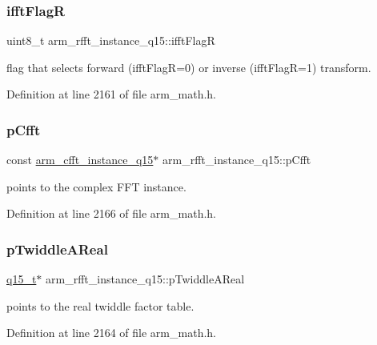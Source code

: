 \subsubsection{\texorpdfstring{ifft\+FlagR}{ifftFlagR}}
{\footnotesize\ttfamily uint8\+\_\+t arm\+\_\+rfft\+\_\+instance\+\_\+q15\+::ifft\+FlagR}

flag that selects forward (ifft\+FlagR=0) or inverse (ifft\+FlagR=1) transform. 

Definition at line 2161 of file arm\+\_\+math.\+h.

\mbox{\label{structarm__rfft__instance__q15_a4329c15b056444746d37ff082a24d31a}} 
\subsubsection{\texorpdfstring{p\+Cfft}{pCfft}}
{\footnotesize\ttfamily const \hyperlink{structarm__cfft__instance__q15}{arm\+\_\+cfft\+\_\+instance\+\_\+q15}$\ast$ arm\+\_\+rfft\+\_\+instance\+\_\+q15\+::p\+Cfft}

points to the complex F\+FT instance. 

Definition at line 2166 of file arm\+\_\+math.\+h.

\mbox{\label{structarm__rfft__instance__q15_affbf2de522ac029432d98e8373c0ec53}} 
\subsubsection{\texorpdfstring{p\+Twiddle\+A\+Real}{pTwiddleAReal}}
{\footnotesize\ttfamily \hyperlink{arm__math_8h_ab5a8fb21a5b3b983d5f54f31614052ea}{q15\+\_\+t}$\ast$ arm\+\_\+rfft\+\_\+instance\+\_\+q15\+::p\+Twiddle\+A\+Real}

points to the real twiddle factor table. 

Definition at line 2164 of file arm\+\_\+math.\+h.

\mbox{\label{structarm__rfft__instance__q15_a937d815022adc557b435ba8c6cd58b0d}} 
